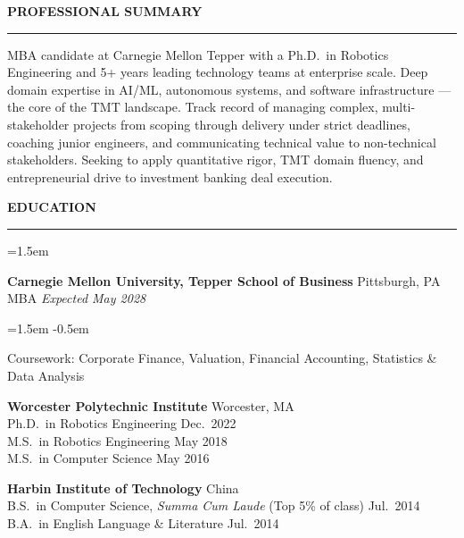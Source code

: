 \documentclass{resume}
\renewenvironment{rSection}[1]{%
  \sectionskip
  {\color{accent}\MakeUppercase{\bf #1}}%
  \sectionlineskip
  {\color{accent}\hrule}%
  \begin{list}{}{\leftmargin=1.5em}%
  \item[]
}{%
  \end{list}
}
\newenvironment{summaryBlock}{%
  \sectionskip
  {\color{accent}\MakeUppercase{\bf Professional Summary}}%
  \sectionlineskip
  {\color{accent}\hrule}%
  \smallskip\noindent\ignorespaces
}{%
  \par\medskip
}
\begin{document}
\begin{summaryBlock}
MBA candidate at Carnegie Mellon Tepper with a Ph.D.\ in Robotics Engineering
and 5+ years leading technology teams at enterprise scale.
Deep domain expertise in AI/ML, autonomous systems, and software infrastructure
--- the core of the TMT landscape.
Track record of managing complex, multi-stakeholder projects from scoping
through delivery under strict deadlines, coaching junior engineers, and
communicating technical value to non-technical stakeholders.
Seeking to apply quantitative rigor, TMT domain fluency, and
entrepreneurial drive to investment banking deal execution.
\end{summaryBlock}

\begin{rSection}{Education}

{\bf Carnegie Mellon University, Tepper School of Business} \hfill Pittsburgh, PA \\
MBA \hfill {\em Expected May 2028}
\begin{list}{\small\textbullet}{\leftmargin=1.5em}
  \itemsep -0.5em \vspace{-0.5em}
  \item Coursework: Corporate Finance, Valuation, Financial Accounting, Statistics \& Data Analysis
\end{list}

\smallskip
{\bf Worcester Polytechnic Institute} \hfill Worcester, MA \\
Ph.D.\ in Robotics Engineering \hfill Dec.\ 2022 \\
M.S.\ in Robotics Engineering \hfill May 2018 \\
M.S.\ in Computer Science \hfill May 2016

\smallskip
{\bf Harbin Institute of Technology} \hfill China \\
B.S.\ in Computer Science, \emph{Summa Cum Laude} (Top 5\% of class) \hfill Jul.\ 2014 \\
B.A.\ in English Language \& Literature \hfill Jul.\ 2014

\end{rSection}
\end{document}
